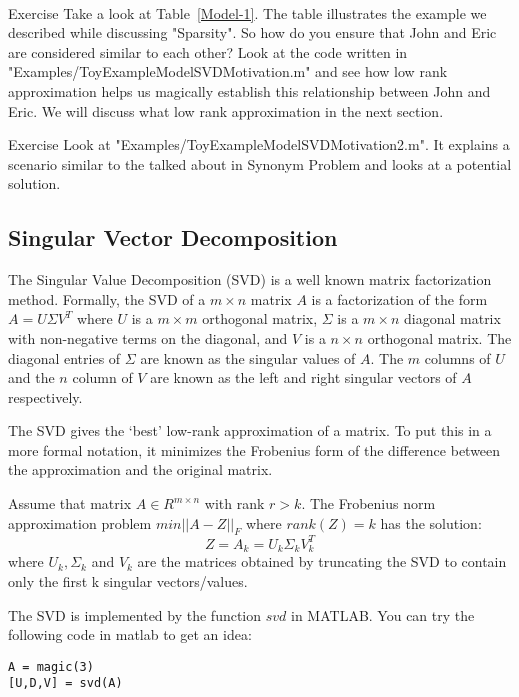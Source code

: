 \\
\begin{myremark}{Exercise }
Take a look at Table~\ref{Model-1}. The table illustrates the example we described while discussing "Sparsity". So how do you ensure that John and Eric are considered similar to each other? Look at the code written in "Examples/ToyExampleModelSVDMotivation.m" and see how low rank approximation helps us magically establish this relationship between John and Eric. We will discuss what low rank approximation in the next section. 
\end{myremark}

\begin{myremark}{Exercise }
Look at "Examples/ToyExampleModelSVDMotivation2.m". It explains a scenario similar to the talked about in Synonym Problem and looks at a potential solution.
\end{myremark}
  \subsection{Singular Vector Decomposition}

The Singular Value Decomposition (SVD) is a well known matrix factorization method. Formally, the SVD of a $m \times n$ matrix $A$ is a factorization of the form $A = U \Sigma V^{T}$ where $U$ is a $m \times m$ orthogonal matrix, $\Sigma$ is a $m \times n$ diagonal matrix with non-negative terms on the diagonal, and $V$ is a $n \times n$ orthogonal matrix. The diagonal entries of $\Sigma$ are known as the singular values of $A$. The $m$ columns of $U$ and the $n$ column of $V$ are known as the left and right singular vectors of $A$ respectively. 

The SVD gives the `best' low-rank approximation of a matrix. To put this in a more formal notation, it minimizes the Frobenius form of the difference between the approximation and the original matrix.

Assume that matrix $A \in R^{m \times n}$ with rank $r > k$. The Frobenius norm approximation problem $min || A - Z ||_{F}$ where $rank(Z) = k$ has the solution:
\[Z = A_{k} = U_{k} \Sigma_{k} V_{k}^{T}\]
where $U_{k}, \Sigma_{k}$ and $V_{k}$ are the matrices obtained by truncating the SVD to contain only the first k singular vectors/values.

The SVD is implemented by the function $svd$ in MATLAB. You can try the following code in matlab to get an idea:
\begin{verbatim}
A = magic(3)
[U,D,V] = svd(A)
\end{verbatim}

